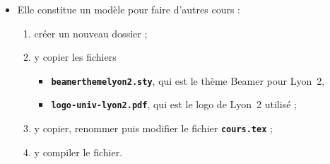  \begin{itemize}
  \item Elle constitue un modèle pour faire d'autres cours :
    
    \begin{enumerate}
    \item créer un nouveau dossier ;
    \item y copier les fichiers 
      
      \begin{itemize}
      \item \texttt{\textbf{beamerthemelyon2.sty}}, qui est le thème Beamer pour Lyon~2,
      \item \texttt{\textbf{logo-univ-lyon2.pdf}}, qui est le logo de Lyon~2 utilisé ;
      \end{itemize}
      
    \item y copier, renommer puis modifier le fichier \texttt{\textbf{cours.tex}} ;
    \item y compiler le fichier.
    \end{enumerate}
  \end{itemize}
